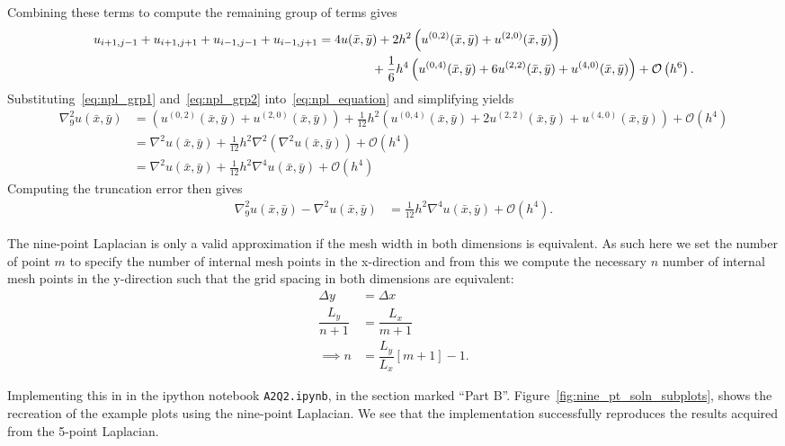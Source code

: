 \documentclass[12pt]{article}
\newcommand{\xbar}{\bar{x}}
\newcommand{\ybar}{\bar{y}}
\newcommand{\bO}{\mathcal{O}}
\begin{document}
Combining these terms to compute the remaining group of terms gives 
\begin{align}
	u_{i+1,j-1}+u_{i+1,j+1}+u_{i-1,j-1}+u_{i-1,j+1} &= 4 u(\xbar,\ybar)
	+2h^2\left(u^{(0,2)}(\xbar,\ybar)+u^{(2,0)}(\xbar,\ybar)\right)\nonumber\\
	&\hspace{1.5cm}+\frac{1}{6} h^4 \left(u^{(0,4)}(\xbar,\ybar)+6	u^{(2,2)}(\xbar,\ybar)+u^{(4,0)}(\xbar,\ybar)\right)
	+\bO\left(h^6\right).\label{eq:npl_grp2}
\end{align}
Substituting~\eqref{eq:npl_grp1} and~\eqref{eq:npl_grp2} into~\eqref{eq:npl_equation} and simplifying yields
\begin{subequations}
	\begin{align}
		\nabla^{2}_{9}u(\xbar,\ybar) &= \left(u^{(0,2)}(\xbar,\ybar)+u^{(2,0)}(\xbar,\ybar)\right)+\frac{1}{12} h^2 \left(u^{(0,4)}(\xbar,\ybar)+2
		u^{(2,2)}(\xbar,\ybar)+u^{(4,0)}(\xbar,\ybar)\right)+\bO\left(h^4\right)\\
		&= \nabla^{2}u(\xbar,\ybar)+\frac{1}{12}h^2 \nabla^{2}\left(\nabla^{2}u(\xbar,\ybar)\right)+\bO\left(h^4\right)\\
		&= \nabla^{2}u(\xbar,\ybar)+\frac{1}{12}h^2 \nabla^{4}u(\xbar,\ybar)+\bO\left(h^4\right)
	\end{align}
\end{subequations}
Computing the truncation error then gives
\begin{align}
	\nabla^{2}_{9}u(\xbar,\ybar) - \nabla^{2}u(\xbar,\ybar) &= \frac{1}{12} h^2 \nabla^{4}u(\xbar,\ybar)+\bO\left(h^4\right).
\end{align}

The nine-point Laplacian is only a valid approximation if the mesh width in both dimensions is equivalent. As such here we set the number of point $m$ to specify the number of internal mesh points in the x-direction and from this we compute the necessary $n$ number of internal mesh points in the y-direction such that the grid spacing in both dimensions are equivalent:
\begin{subequations}
	\begin{align}
		\Delta y &= \Delta x\\
		\dfrac{L_{y}}{n+1} &= \dfrac{L_{x}}{m+1}\\
		\implies n &= \dfrac{L_{y}}{L_{x}}\left[m+1\right]-1.
	\end{align}
\end{subequations}

Implementing this in in the ipython notebook \verb|A2Q2.ipynb|, in the section marked ``Part B''. Figure~\ref{fig:nine_pt_soln_subplots}, shows the recreation of the example plots using the nine-point Laplacian. We see that the implementation successfully reproduces the results acquired from the 5-point Laplacian. 
\end{document}
